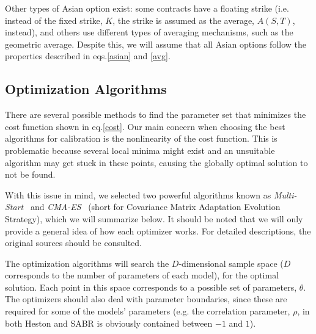 Other types of Asian option exist: some contracts have a floating strike (i.e. instead of the fixed strike, $K$, the strike is assumed as the average, $A(S,T)$, instead), and others use different types of averaging mechanisms, such as the geometric average. Despite this, we will assume that all Asian options follow the properties described in eqs.\eqref{asian} and \eqref{avg}.











\subsection{Optimization Algorithms}
There are several possible methods to find the parameter set that minimizes the cost function shown in eq.\eqref{cost}.
Our main concern when choosing the best algorithms for calibration is the nonlinearity of the cost function. This is problematic because several local minima might exist and an unsuitable algorithm may get stuck in these points, causing the globally optimal solution to not be found.

With this issue in mind, we selected two powerful algorithms known as \emph{Multi-Start}~\cite{Ugray} and \emph{CMA-ES}~\cite{Hansen2} (short for Covariance Matrix Adaptation Evolution Strategy), which we will summarize below. It should be noted that we will only provide a general idea of how each optimizer works. For detailed descriptions, the original sources should be consulted.

The optimization algorithms will search the $D$-dimensional sample space ($D$ corresponds to the number of parameters of each model), for the optimal solution. Each point in this space corresponds to a possible set of parameters, $\theta$.
The optimizers should also deal with parameter boundaries, since these are required for some of the models' parameters (e.g. the correlation parameter, $\rho$, in both Heston and SABR is obviously contained between $-1$ and $1$).


